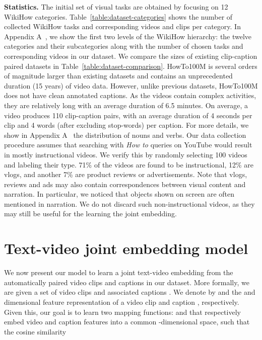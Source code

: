 \documentclass[10pt,twocolumn,letterpaper]{article}
\begin{document}
\vspace{1mm}
\noindent
\textbf{Statistics.}
The initial set of visual tasks are obtained by focusing on 12 WikiHow categories.
Table~\ref{table:dataset-categories} shows the number of collected WikiHow tasks and corresponding videos and clips per category.
In Appendix A~\cite{miech19howto100m}, we show the first two levels of the WikiHow hierarchy: the twelve categories and their subcategories along with the number of chosen tasks and corresponding videos in our dataset.
We compare the sizes of existing clip-caption paired datasets in Table~\ref{table:dataset-comparison}. 
HowTo100M is several orders of magnitude larger than existing datasets and contains an unprecedented duration (15 years) of video data.
However, unlike previous datasets, HowTo100M does not have clean annotated captions.
As the videos contain complex activities, they are relatively long with an average duration of 6.5 minutes.
On average, a video produces 110 clip-caption pairs, with an average duration of 4 seconds per clip and 4 words (after excluding stop-words) per caption.
For more details, we show in Appendix A~\cite{miech19howto100m} the distribution of nouns and verbs.
Our data collection procedure assumes that searching with \textit{How to} queries on YouTube would result in mostly instructional videos.
We verify this by randomly selecting 100 videos and labeling their type.
71\% of the videos are found to be instructional, 12\% are vlogs, and another 7\% are product reviews or advertisements.
Note that vlogs, reviews and ads may also contain correspondences between visual content and narration.
In particular, we noticed that objects shown on screen are often mentioned in narration.
We do not discard such non-instructional videos, as they may still be useful for the learning the joint embedding.

 

\section{Text-video joint embedding model}
\label{section:model}

We now present our model to learn a joint text-video embedding from the automatically paired video clips and captions in our dataset.
More formally, we are given a set of  video clips and associated captions .
We denote by  and  the  and  dimensional feature representation of a video clip  and caption , respectively.
Given this, our goal is to learn two mapping functions:  and 
that respectively embed video and caption features into a common -dimensional space, such that the cosine similarity
\end{document}
